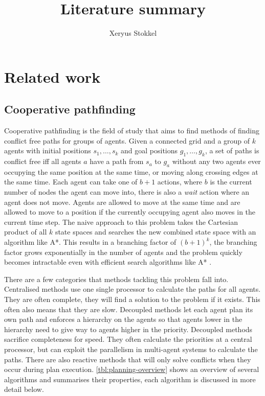\documentclass[a4paper]{article}
\title{Literature summary}
\author{Xeryus Stokkel}
\begin{document}
\maketitle

\section{Related work}
\subsection{Cooperative pathfinding}
Cooperative pathfinding is the field of study that aims to find methods of
finding conflict free paths for groups of agents. Given a connected grid and a
group of $k$ agents with initial positions $s_1, \ldots, s_k$ and goal
positions $g_1, \ldots, g_k$, a set of paths is conflict free iff all agents
$a$ have a path from $s_a$ to $g_a$ without any two agents ever occupying
the same position at the same time, or moving along crossing edges at the same
time. Each agent can take one of $b+1$ actions, where $b$ is the current number
of nodes the agent can move into, there is also a \textit{wait} action where an
agent does not move. Agents are allowed to move at the same time and are
allowed to move to a position if the currently occupying agent also moves in
the current time step. The naive approach to this problem takes the Cartesian
product of all $k$ state spaces and searches the new combined state space with
an algorithm like A*. This results in a branching factor of $(b+1)^k$, the
branching factor grows exponentially in the number of agents and the problem
quickly becomes intractable even with efficient search algorithms like A*
\cite{sharon2013}.

There are a few categories that methods tackling this problem fall into.
Centralised methods use one single processor to calculate the paths for all
agents. They are often complete, they will find a solution to the problem if it
exists. This often also means that they are slow. Decoupled methods let each
agent plan its own path and enforces a hierarchy on the agents so that agents
lower in the hierarchy need to give way to agents higher in the priority.
Decoupled methods sacrifice completeness for speed. They often calculate the
priorities at a central processor, but can exploit the parallelism in
multi-agent systems to calculate the paths. There are also reactive methods
that will only solve conflicts when they occur during plan execution.
\autoref{tbl:planning-overview} shows an overview of several algorithms and
summarises their properties, each algorithm is discussed in more detail below.
\end{document}
